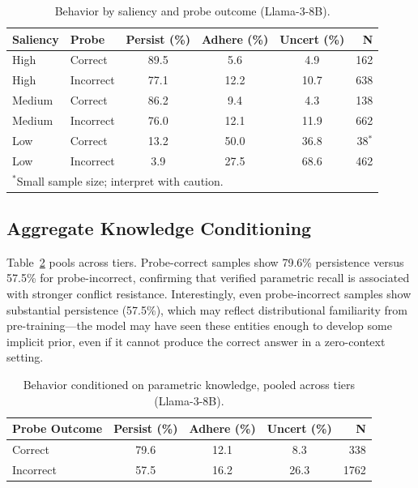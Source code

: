 \documentclass[11pt, letterpaper]{article}
\begin{document}
\begin{table}[H]
\centering
\caption{Behavior by saliency and probe outcome (Llama-3-8B).}
\label{tab:interaction}
\begin{tabular}{ll|ccc|r}
\toprule
\textbf{Saliency} & \textbf{Probe} & \textbf{Persist (\%)} & \textbf{Adhere (\%)} & \textbf{Uncert (\%)} & \textbf{N} \\
\midrule
High   & Correct   & 89.5 & 5.6  & 4.9  & 162 \\
High   & Incorrect & 77.1 & 12.2 & 10.7 & 638 \\
\midrule
Medium & Correct   & 86.2 & 9.4  & 4.3  & 138 \\
Medium & Incorrect & 76.0 & 12.1 & 11.9 & 662 \\
\midrule
Low    & Correct   & 13.2 & 50.0 & 36.8 & 38$^*$ \\
Low    & Incorrect & 3.9  & 27.5 & 68.6 & 462 \\
\bottomrule
\multicolumn{6}{l}{\footnotesize $^*$Small sample size; interpret with caution.}
\end{tabular}
\end{table}

\subsection*{Aggregate Knowledge Conditioning}

Table~\ref{tab:conditioning} pools across tiers. Probe-correct samples show 79.6\% persistence versus 57.5\% for probe-incorrect, confirming that verified parametric recall is associated with stronger conflict resistance. Interestingly, even probe-incorrect samples show substantial persistence (57.5\%), which may reflect distributional familiarity from pre-training---the model may have seen these entities enough to develop some implicit prior, even if it cannot produce the correct answer in a zero-context setting.

\begin{table}[H]
\centering
\caption{Behavior conditioned on parametric knowledge, pooled across tiers (Llama-3-8B).}
\label{tab:conditioning}
\begin{tabular}{l|ccc|r}
\toprule
\textbf{Probe Outcome} & \textbf{Persist (\%)} & \textbf{Adhere (\%)} & \textbf{Uncert (\%)} & \textbf{N} \\
\midrule
Correct   & 79.6 & 12.1 & 8.3  & 338 \\
Incorrect & 57.5 & 16.2 & 26.3 & 1762 \\
\bottomrule
\end{tabular}
\end{table}
\end{document}
